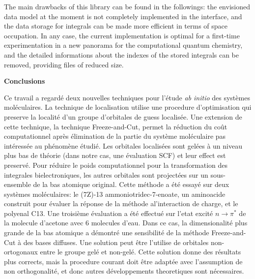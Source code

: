 The main drawbacks of this library can be found in the followings: the
envisioned data model at the moment is not completely implemented in the
interface, and the data storage for integrals can be made more efficient in
terms of space occupation. In any case, the current implementation is
optimal for a first-time experimentation in a new panorama for the
computational quantum chemistry, and the detailed informations about the
indexes of the stored integrals can be removed, providing files of reduced
size.

\clearpage
\thispagestyle{empty}
{ \Huge \textbf{Conclusions} } 
\vspace{1mm} \\
\thispagestyle{empty}

Ce travail a regard\'e deux nouvelles techniques pour l'\'etude \textit{ab
initio} des syst\`emes mol\'eculaires. La technique de localisation utilise
une procedure d'optimisation qui preserve la localit\'e d'un groupe
d'orbitales de guess localis\'ee. Une extension de cette technique, la
technique Freeze-and-Cut, permet la r\'eduction du co\^ut computationnel
apr\`es \'elimination de la partie du syst\`eme  mol\'eculaire pas
int\'eress\'ee au ph\'enom\`ene \'etudi\'e.
Les orbitales localis\'ees sont gel\'ees \`a un niveau plus bas de th\'eorie
(dans notre cas, une \'evaluation SCF) et leur effect est preserv\'e. 
Pour r\'eduire le poids computationnel pour la transformation des integrales
bielectroniques, les autres orbitales sont project\'ees sur un sous-ensemble
de la bas atomique original. Cette m\'ethode a \'et\'e essay\'e sur deux
syst\`emes mol\'eculaires: le (7Z)-13 ammoniotridec-7-enoate, un aminoacide
construit pour \'evaluer la r\'eponse de la m\'ethode al'interaction de
charge, et le polyenal C13.
Une troisi\`eme \'evaluation a \'et\'e effectu\'e sur l'etat excit\'e $n \rightarrow
\pi^{*}$ de la molecule d'acetone avec 6 molecules d'eau. Dans ce cas, la
dimensionalit\'e plus grande de la bas atomique a d\'emontr\'e une
sensibilit\'e de la m\'ethode Freeze-and-Cut \`a des bases diffuses. Une solution
peut \^etre l'utilise de orbitales non-ortogonaux entre le groupe gel\'e et
non-gel\'e. Cette solution donne des r\'esultats plus corrects, mais la
procedure courant doit \^etre adapt\'ee avec l'assumption de non
orthogonalit\'e, et donc autres d\'eveloppements theoretiques sont
n\'ecessaires.

